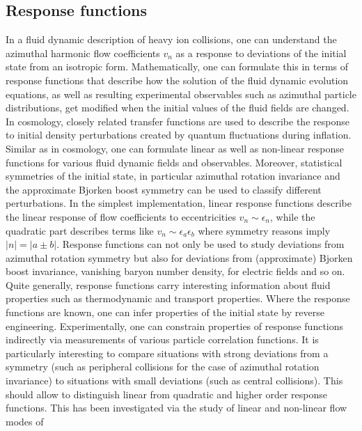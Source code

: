 \subsection{Response functions}
In a fluid dynamic description of heavy ion collisions,  one can understand 
  the azimuthal harmonic flow coefficients $v_n$ as a response to deviations 
  of the initial state from an isotropic form. 
Mathematically,  one can formulate this in terms of response functions that 
  describe how the solution of the fluid dynamic evolution equations,  
  as well as resulting experimental observables such as azimuthal particle 
  distributions, get modified when the initial values of the fluid fields 
  are changed. 
In cosmology, closely related transfer functions are used to describe the 
  response to initial density perturbations created by quantum fluctuations 
  during inflation. Similar as in cosmology,  one can formulate linear as 
  well as non-linear response functions for various fluid dynamic fields 
  and observables. 
Moreover,  statistical symmetries of the initial state,  in particular 
  azimuthal rotation invariance and the approximate Bjorken boost symmetry 
  can be used to classify different perturbations. 
In the simplest implementation,  linear response functions describe the 
  linear response of flow coefficients to eccentricities $v_n \sim\epsilon_n$,  
  while the quadratic part describes terms like $v_n \sim \epsilon_a\epsilon_b$ 
  where symmetry reasons imply $|n|=|a\pm b|$. 
Response functions can not only be used to study deviations from azimuthal 
  rotation symmetry but also for deviations from (approximate) Bjorken boost 
  invariance,  vanishing baryon number density, for electric fields and so on. 
Quite generally, response functions carry interesting information about fluid 
  properties such as thermodynamic and transport properties. 
  Where the response functions are known, one can infer properties of the 
  initial state by reverse engineering.
Experimentally, one can constrain properties of response functions indirectly 
  via measurements of various particle correlation functions. 
It is particularly interesting to compare situations with strong deviations 
  from a symmetry (such as peripheral collisions for the case of azimuthal 
  rotation invariance) to situations with small deviations (such as central collisions). 
This should allow to distinguish linear from quadratic and higher order response functions.
This has been investigated via the study of linear and non-linear flow modes of
